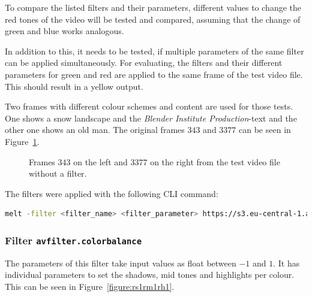 \documentclass[../MasterThesis.tex]{subfiles}
\begin{document}
To compare the listed filters and their parameters, different values to change the red tones of the video will be tested and compared, assuming that the change of green and blue works analogous.

In addition to this, it needs to be tested, if multiple parameters of the same filter can be applied simultaneously. For evaluating, the filters and their different parameters for green and red are applied to the same frame of the test video file. This should result in a yellow output. 

Two frames with different colour schemes and content are used for those tests. One shows a snow landscape and the \textit{Blender Institute Production}-text and the other one shows an old man. The original frames $343$ and $3377$ can be seen in Figure~\ref{figure:nofilter}.

\begin{figure}[H]
	\begin{center}
		\caption[Frames $343$ and $3377$ from the test video file without a filter.]{Frames $343$ on the left and $3377$ on the right from the test video file without a filter.}
		\label{figure:nofilter}
	\end{center}
\end{figure}

The filters were applied with the following CLI command:
\begin{lstlisting}[language=bash, numbers=none]
	melt -filter <filter_name> <filter_parameter> https://s3.eu-central-1.amazonaws.com/accurate-player-demo-assets/timecode/sintel-2048-timecode-stereo.mp4 -consumer xgl
\end{lstlisting}















\subsubsection*{Filter \texttt{avfilter.colorbalance}}

The parameters of this filter take input values as float between $-1$ and $1$. It has individual parameters to set the shadows, mid tones and highlights per colour. This can be seen in Figure~\ref{figure:rs1rm1rh1}.
\end{document}
